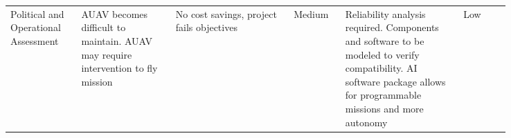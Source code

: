 \begin{landscape}
{\begin{longtable}{| p{0.12\linewidth} | p{0.16\linewidth} |  p{0.20\linewidth} | p{0.08\linewidth} | p{0.20\linewidth} | p{0.08\linewidth} |}
	\hline
	Political and Operational Assessment & AUAV becomes difficult to maintain. \newline AUAV may require intervention to fly mission & No cost savings, project fails objectives & \cellcolor{yellow} Medium & Reliability analysis required. \newline Components and software to be modeled to verify compatibility. \newline AI software package allows for programmable missions and more autonomy & \cellcolor{green} Low
	\label{tab:sr01_feasibility}
\end{longtable}
}

\end{landscape}